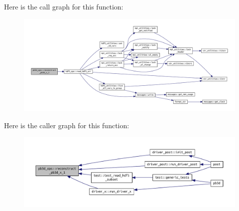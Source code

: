 Here is the call graph for this function\+:
\nopagebreak
\begin{figure}[H]
\begin{center}
\leavevmode
\includegraphics[width=350pt]{namespacepb3d__ops_ababe805fcaaca1486c74ad7a8aecfb7e_cgraph}
\end{center}
\end{figure}
Here is the caller graph for this function\+:
\nopagebreak
\begin{figure}[H]
\begin{center}
\leavevmode
\includegraphics[width=350pt]{namespacepb3d__ops_ababe805fcaaca1486c74ad7a8aecfb7e_icgraph}
\end{center}
\end{figure}
\mbox{\label{namespacepb3d__ops_a50f211992fbe20a56749b2be81a521e6}} 
